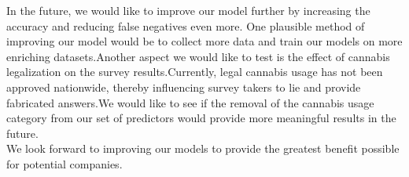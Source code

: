 In the future, we would like to improve our model further by increasing the accuracy and reducing false negatives even more. One plausible method of improving our model would be to collect more data and train our models on more enriching datasets.\hspace{1pt}Another aspect we would like to test is the effect of cannabis legalization on the survey results.\hspace{1pt}Currently, legal cannabis usage has not been approved nationwide, thereby influencing survey takers to lie and provide fabricated answers.\hspace{1pt}We would like to see if the removal of the cannabis usage category from our set of predictors would provide more meaningful results in the future.\\

We look forward to improving our models to provide the greatest benefit possible for potential companies.
